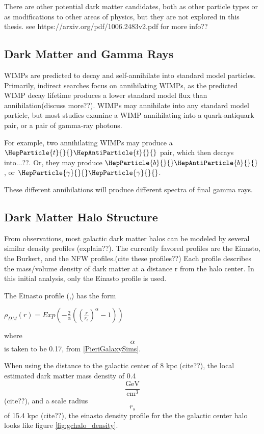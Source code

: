     There are other potential dark matter candidates, both as other particle types or as modifications to other areas of physics, but they are not explored in this thesis.
    see https://arxiv.org/pdf/1006.2483v2.pdf for more info??
  \subsection{Dark Matter and Gamma Rays}
    WIMPs are predicted to decay and self-annihilate into standard model particles.
    Primarily, indirect searches focus on annihilating WIMPs, as the predicted WIMP decay lifetime produces a lower standard model flux than annihilation(discuss more??).
    WIMPs may annihilate into any standard model particle, but most studies examine a WIMP annihilating into a quark-antiquark pair, or a pair of gamma-ray photons.

    For example, two annihilating WIMPs may produce a $\HepParticle{t}{}{}\HepAntiParticle{t}{}{}$ pair, which then decays into...??.
    Or, they may produce $\HepParticle{b}{}{}\HepAntiParticle{b}{}{}$, or $\HepParticle{\gamma}{}{}\HepParticle{\gamma}{}{}$.

    These different annihilations will produce different spectra of final gamma rays.
  \subsection{Dark Matter Halo Structure}
    From observations, most galactic dark matter halos can be modeled by several similar density profiles (explain??).
    The currently favored profiles are the Einasto, the Burkert, and the NFW profiles.(cite these profiles??)
    Each profile describes the mass/volume density of dark matter at a distance r from the halo center.
    In this initial analysis, only the Einasto profile is used.

    The Einasto profile (\cite{einastoprofile1},\cite{einastoprofile2}) has the form

    $ \rho_{DM} \left( r \right) = Exp \left( - \frac{2}{\alpha} \left( {\left( \frac{r}{r_o} \right)}^{\alpha} - 1 \right) \right)$ \label{eqn:einasto}
    
    where $$\alpha$$ is taken to be 0.17, from \ref{PieriGalaxySims}.
    
    When using the distance to the galactic center of 8 kpc (cite??), the local estimated dark matter mass density of 0.4 $$ \frac{ \text{GeV} }{ \text{cm}^3 } $$ (cite??), and a scale radius $$r_s$$ of 15.4 kpc (cite??), the einasto density profile for the the galactic center halo looks like figure \ref{fig:gchalo_density}.
  
